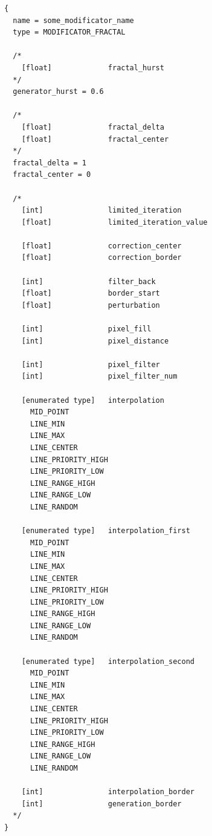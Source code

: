 \documentclass[9pt]{article}
\begin{document}
\begin{verbatim}
{
  name = some_modificator_name
  type = MODIFICATOR_FRACTAL

  /*
    [float]             fractal_hurst
  */
  generator_hurst = 0.6
  
  /*
    [float]             fractal_delta
    [float]             fractal_center
  */
  fractal_delta = 1
  fractal_center = 0
  
  /*
    [int]               limited_iteration
    [float]             limited_iteration_value
    
    [float]             correction_center
    [float]             correction_border
    
    [int]               filter_back
    [float]             border_start
    [float]             perturbation
    
    [int]               pixel_fill
    [int]               pixel_distance
    
    [int]               pixel_filter
    [int]               pixel_filter_num
  
    [enumerated type]   interpolation
      MID_POINT
      LINE_MIN
      LINE_MAX
      LINE_CENTER
      LINE_PRIORITY_HIGH
      LINE_PRIORITY_LOW
      LINE_RANGE_HIGH
      LINE_RANGE_LOW
      LINE_RANDOM
      
    [enumerated type]   interpolation_first
      MID_POINT
      LINE_MIN
      LINE_MAX
      LINE_CENTER
      LINE_PRIORITY_HIGH
      LINE_PRIORITY_LOW
      LINE_RANGE_HIGH
      LINE_RANGE_LOW
      LINE_RANDOM

    [enumerated type]   interpolation_second
      MID_POINT
      LINE_MIN
      LINE_MAX
      LINE_CENTER
      LINE_PRIORITY_HIGH
      LINE_PRIORITY_LOW
      LINE_RANGE_HIGH
      LINE_RANGE_LOW
      LINE_RANDOM
        
    [int]               interpolation_border      
    [int]               generation_border
  */  
}
\end{verbatim}
\end{document}
